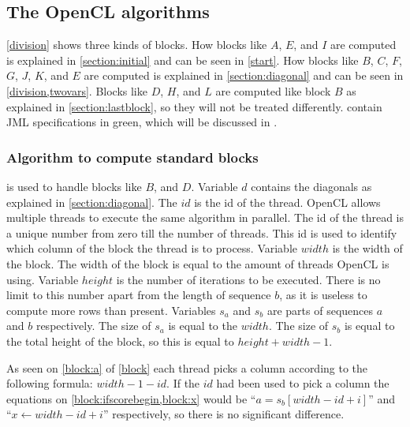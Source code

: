 \subsection{The OpenCL algorithms} \label{algorithms}
\cref{division} shows three kinds of blocks.
How blocks like $A$, $E$, and $I$ are computed is explained in \cref{section:initial} and can be seen in \cref{start}.
How blocks like $B$, $C$, $F$, $G$, $J$, $K$, and $E$ are computed is explained in \cref{section:diagonal} and can be seen in \cref{division,twovars}.
Blocks like $D$, $H$, and $L$ are computed like block $B$ as explained in \cref{section:lastblock}, so they will not be treated differently.
 contain JML specifications in green, which will be discussed in .

\subsubsection{Algorithm to compute standard blocks}
 is used to handle blocks like $B$, and $D$.
Variable $d$ contains the diagonals as explained in \cref{section:diagonal}.
The $id$ is the id of the thread.
OpenCL allows multiple threads to execute the same algorithm in parallel.
The id of the thread is a unique number from zero till the number of threads.
This id is used to identify which column of the block the thread is to process.
Variable $width$ is the width of the block.
The width of the block is equal to the amount of threads OpenCL is using.
Variable $height$ is the number of iterations to be executed.
There is no limit to this number apart from the length of sequence $b$, as it is useless to compute more rows than present.
Variables $s_a$ and $s_b$ are parts of sequences $a$ and $b$ respectively.
The size of $s_a$ is equal to the $width$.
The size of $s_b$ is equal to the total height of the block, so this is equal to $height + width - 1$.

As seen on \cref{block:a} of \cref{block} each thread picks a column according to the following formula: $width - 1 - id$.
If the $id$ had been used to pick a column the equations on \cref{block:ifscorebegin,block:x} would be ``$a = s_b[width - id + i]$'' and ``$x \gets width - id + i$'' respectively, so there is no significant difference.

